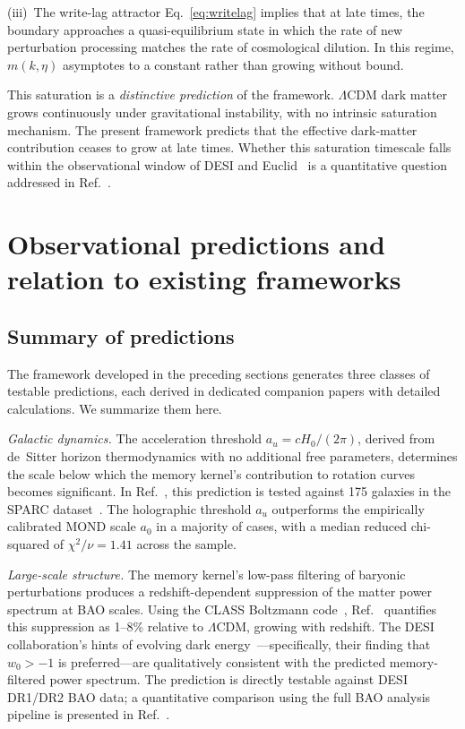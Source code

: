 \documentclass[aps,prd,twocolumn,superscriptaddress,nofootinbib]{revtex4-2}
\begin{document}
(iii)~The write-lag attractor Eq.~\eqref{eq:writelag} implies that at late times, the boundary approaches a quasi-equilibrium state in which the rate of new perturbation processing matches the rate of cosmological dilution. In this regime, $m(k,\eta)$ asymptotes to a constant rather than growing without bound.

This saturation is a \emph{distinctive prediction} of the framework. $\Lambda$CDM dark matter grows continuously under gravitational instability, with no intrinsic saturation mechanism. The present framework predicts that the effective dark-matter contribution ceases to grow at late times. Whether this saturation timescale falls within the observational window of DESI and Euclid~\cite{Euclid2024} is a quantitative question addressed in Ref.~\cite{PaperVIII}.


\section{Observational predictions and relation to existing frameworks}
\label{sec:predictions}

\subsection{Summary of predictions}

The framework developed in the preceding sections generates three classes of testable predictions, each derived in dedicated companion papers with detailed calculations. We summarize them here.

\emph{Galactic dynamics.} The acceleration threshold $a_u = cH_0/(2\pi)$, derived from de~Sitter horizon thermodynamics with no additional free parameters, determines the scale below which the memory kernel's contribution to rotation curves becomes significant. In Ref.~\cite{PaperI}, this prediction is tested against 175 galaxies in the SPARC dataset~\cite{McGaugh2016SPARC}. The holographic threshold $a_u$ outperforms the empirically calibrated MOND scale $a_0$ in a majority of cases, with a median reduced chi-squared of $\chi^2/\nu = 1.41$ across the sample.

\emph{Large-scale structure.} The memory kernel's low-pass filtering of baryonic perturbations produces a redshift-dependent suppression of the matter power spectrum at BAO scales. Using the CLASS Boltzmann code~\cite{CLASS2011}, Ref.~\cite{PaperVIII} quantifies this suppression as 1--8\% relative to $\Lambda$CDM, growing with redshift. The DESI collaboration's hints of evolving dark energy~\cite{DESI2024}---specifically, their finding that $w_0 > -1$ is preferred---are qualitatively consistent with the predicted memory-filtered power spectrum. The prediction is directly testable against DESI DR1/DR2 BAO data; a quantitative comparison using the full BAO analysis pipeline is presented in Ref.~\cite{PaperVIII}.
\end{document}
